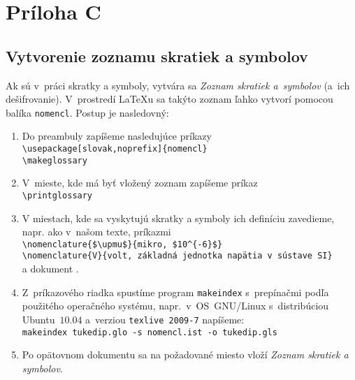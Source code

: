 \section*{Pr\'iloha C}
\subsection*{Vytvorenie zoznamu skratiek a symbolov}

Ak sú v~práci skratky a symboly, vytvára sa \emph{Zoznam skratiek
a~symbolov} (a~ich dešifrovanie). V~prostredí \LaTeX{}u sa takýto
zoznam
ľahko vytvorí pomocou balíka \verb+nomencl+. Postup je nasledovný:
\begin{enumerate}
\item Do preambuly zapíšeme nasledujúce príkazy\\
\verb+\usepackage[slovak,noprefix]{nomencl}+\\ \verb+\makeglossary+
\item  V~mieste, kde má byť\/ vložený zoznam zapíšeme príkaz\\
\verb+\printglossary+
\item V miestach, kde sa vyskytujú skratky a symboly ich definíciu
zavedieme, napr. ako     	v~našom texte, príkazmi\\
\verb+\nomenclature{$\upmu$}{mikro, $10^{-6}$}+\\
\verb+\nomenclature{V}{volt, základná jednotka napätia v sústave SI}+\\
a dokument .
\item Z~príkazového riadka spustíme program \verb+makeindex+
s~prepínačmi podľa použitého operačného systému, napr.~v~OS~GNU/Linux
s~distribúciou Ubuntu~$10.04$ a~verziou \verb+texlive 2009-7+
napíšeme:\\
\verb*+makeindex tukedip.glo -s nomencl.ist -o tukedip.gls+
\item Po opätovnom  dokumentu sa na
požadované
miesto vloží \emph{Zoznam skratiek a symbolov}.
\end{enumerate}
